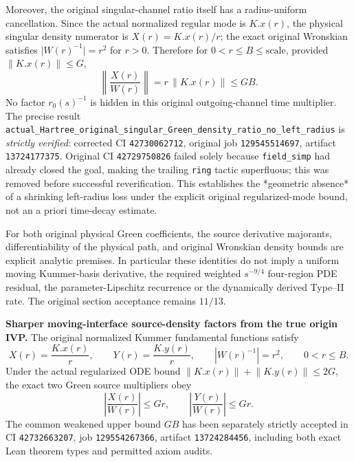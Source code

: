 \documentclass[11pt]{amsart}
\begin{document}
Moreover, the original singular-channel ratio itself has a
radius-uniform cancellation.  Since the actual normalized
regular mode is \(K.x(r)\), the physical singular density numerator
is \(X(r)=K.x(r)/r\); the exact original Wronskian satisfies
\(\lvert W(r)^{-1}\rvert=r^2\) for \(r>0\).
Therefore for \(0<r\le B\le\mathrm{scale}\), provided
\(\lVert K.x(r)\rVert\le G\),
\[
 \boxed{\quad
 \left\lVert\frac{X(r)}{W(r)}\right\rVert
   =r\,\lVert K.x(r)\rVert\le G B .\quad}
\]
No factor \(r_0(s)^{-1}\) is hidden in this
original outgoing-channel time multiplier. The precise result
\texttt{actual\_Hartree\_original\_singular\_Green\_density\_ratio\_no\_left\_radius}
is \emph{strictly verified}: corrected CI \texttt{42730062712},
original job \texttt{129545514697}, artifact \texttt{13724177375}.
Original CI \texttt{42729750826} failed solely because
\texttt{field\_simp} had already closed the goal, making the trailing
\texttt{ring} tactic superfluous; this was removed before successful
reverification. This establishes the *geometric absence* of a shrinking
left-radius loss under the explicit original regularized-mode bound,
not an a priori time-decay estimate.

For both original physical Green coefficients, the source derivative
majorants, differentiability of the physical path, and original
Wronskian density bounds are explicit analytic premises. In particular these identities do not imply a
uniform moving Kummer-basis derivative, the required weighted
\(s^{-9/4}\) four-region PDE residual, the parameter-Lipschitz
recurrence or the dynamically derived Type--II rate. The original
section acceptance remains \(11/13\).


\medskip
\noindent\textbf{Sharper moving-interface source-density factors from the true origin IVP.}
The original normalized Kummer fundamental functions satisfy
\[
 X(r)=\frac{K.x(r)}{r},\qquad
 Y(r)=\frac{K.y(r)}{r},\qquad
 \left|W(r)^{-1}\right|=r^2,\qquad 0<r\le B.
\]
Under the actual regularized ODE bound
\(\lVert K.x(r)\rVert+\lVert K.y(r)\rVert\le 2G\),
the exact two Green source multipliers obey
\[
 \left|\frac{X(r)}{W(r)}\right|\le Gr,\qquad
 \left|\frac{Y(r)}{W(r)}\right|\le Gr.
\]
The common weakened upper bound \(GB\) has been separately strictly
accepted in CI \texttt{42732663207}, job \texttt{129554267366},
artifact \texttt{13724284456}, including both exact Lean theorem
types and permitted axiom audits.
\end{document}
